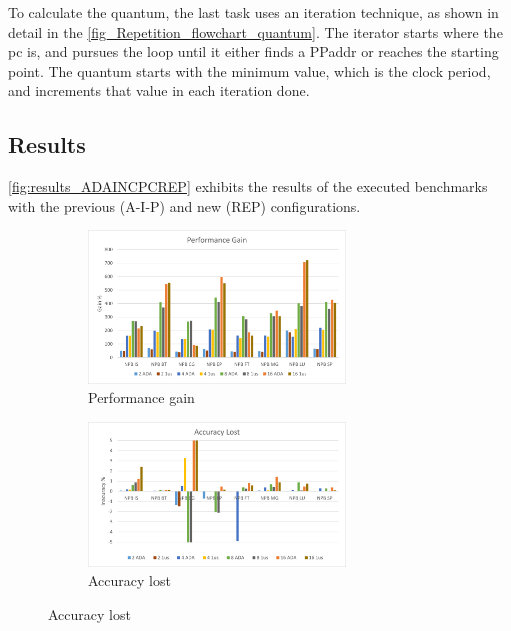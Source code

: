 To calculate the quantum, the last task uses an iteration technique, as shown in detail in the \autoref{fig_Repetition_flowchart_quantum}. 
The iterator starts where the \gls{pc} is, and pursues the loop until it either finds a PPaddr or reaches the starting point. The quantum starts 
with the minimum value, which is the clock period, and increments that value in each iteration done. 

\subsection{Results}

\autoref{fig:results_ADAINCPCREP} exhibits the results of the executed benchmarks with the previous (A-I-P) and new (REP) configurations. 

\begin{figure}[H]
\centering
\begin{subfigure}{\textwidth}
    \centering
    \includegraphics[width=0.75\textwidth]{Images/Performance_ADA.png}
    \caption{ Performance gain}
    \label{fig:Performance_ADAINCPCREP}
\end{subfigure}
\begin{subfigure}{\textwidth}
    \centering
    \includegraphics[width=0.75\textwidth]{Images/Accuracy_ADA.png}
    \caption{ Accuracy lost}
    \label{fig:Accuracy_ADAINCPCREP}
\end{subfigure}

\end{figure}
